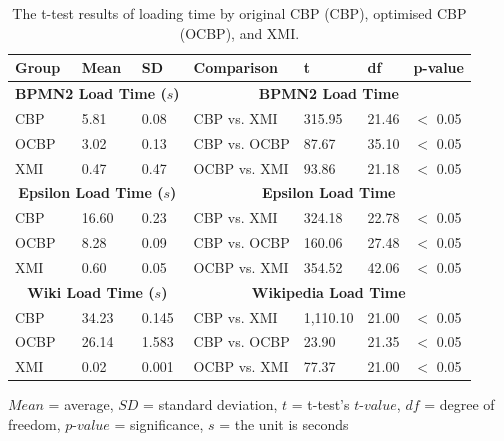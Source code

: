   \begin{table}[ht]
    \footnotesize
    \centering
    \caption{The t-test results of loading time by original CBP (CBP), optimised CBP (OCBP), and XMI.}
    \label{table:ttest_results_loadtime}
    \begin{tabular}
      {|p{}p{}p{}|p{}p{}p{}p{}|}
      \hline
      Group & Mean & SD & Comparison & t & df & p-value \\
      \hline
      \multicolumn{3}{|c|}{\textbf{BPMN2 Load Time ($s$)}} & \multicolumn{4}{c|}{\textbf{BPMN2 Load Time}} \\
      CBP & 5.81 & 0.08 & CBP vs. XMI & 315.95 &21.46 & $<$ 0.05 \\
      OCBP & 3.02 & 0.13 & CBP vs. OCBP & 87.67 & 35.10 & $<$ 0.05 \\
      XMI & 0.47 & 0.47 & OCBP vs. XMI & 93.86 & 21.18 & $<$ 0.05 \\
      \hline
      
      \multicolumn{3}{|c|}{\textbf{Epsilon Load Time ($s$)}} & \multicolumn{4}{c|}{\textbf{Epsilon Load Time}} \\
      CBP & 16.60 & 0.23 & CBP vs. XMI & 324.18 &22.78 & $<$ 0.05 \\
      OCBP & 8.28 & 0.09 & CBP vs. OCBP & 160.06 & 27.48 & $<$ 0.05 \\
      XMI & 0.60 & 0.05 & OCBP vs. XMI & 354.52 &42.06 & $<$ 0.05 \\
      \hline
      
      \multicolumn{3}{|c|}{\textbf{Wiki Load Time ($s$)}} & \multicolumn{4}{c|}{\textbf{Wikipedia Load Time}} \\
      CBP & 34.23 & 0.145 & CBP vs. XMI & 1,110.10 &21.00 & $<$ 0.05 \\
      OCBP & 26.14 & 1.583 & CBP vs. OCBP & 23.90 &21.35 & $<$ 0.05 \\
      XMI & 0.02 & 0.001 & OCBP vs. XMI & 77.37 & 21.00 & $<$ 0.05 \\
      \hline
    \end{tabular}
    \justify
    $Mean$ = average, $SD$ = standard deviation, $t$ = t-test’s $t$-$value$, $df$ = degree of freedom, $p$-$value$ = significance, $s$ = the unit is seconds
  \end{table}
  
